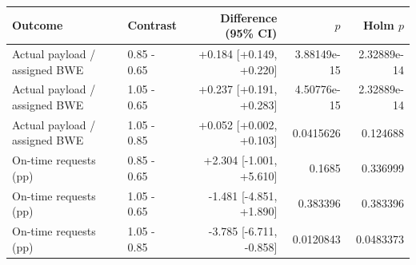 \begin{tabular}{llrrr}
\toprule
Outcome & Contrast & Difference (95\% CI) & $p$ & Holm $p$ \\
\midrule
Actual payload / assigned BWE & 0.85 - 0.65 & +0.184 [+0.149, +0.220] & 3.88149e-15 & 2.32889e-14 \\
Actual payload / assigned BWE & 1.05 - 0.65 & +0.237 [+0.191, +0.283] & 4.50776e-15 & 2.32889e-14 \\
Actual payload / assigned BWE & 1.05 - 0.85 & +0.052 [+0.002, +0.103] & 0.0415626 & 0.124688 \\
On-time requests (pp) & 0.85 - 0.65 & +2.304 [-1.001, +5.610] & 0.1685 & 0.336999 \\
On-time requests (pp) & 1.05 - 0.65 & -1.481 [-4.851, +1.890] & 0.383396 & 0.383396 \\
On-time requests (pp) & 1.05 - 0.85 & -3.785 [-6.711, -0.858] & 0.0120843 & 0.0483373 \\
\bottomrule
\end{tabular}
